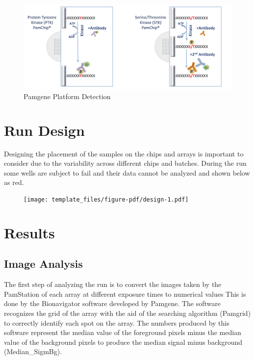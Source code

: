 \documentclass[
  letterpaper,
  DIV=11,
  numbers=noendperiod]{scrreport}
\begin{document}
\begin{figure}[htbp]

{\centering \includegraphics{images/pamgene_detectionFig.png}

}

\caption{Pamgene Platform Detection}

\end{figure}

\hypertarget{run-design}{%
\chapter{Run Design}\label{run-design}}

Designing the placement of the samples on the chips and arrays is
important to consider due to the variability across different chips and
batches. During the run some wells are subject to fail and their data
cannot be analyzed and shown below as red.

\begin{figure}[htbp]

{\centering \texttt{[image: template\_files/figure-pdf/design-1.pdf]}

}

\end{figure}

\hypertarget{results}{%
\chapter{Results}\label{results}}

\hypertarget{image-analysis}{%
\section{Image Analysis}\label{image-analysis}}

The first step of analyzing the run is to convert the images taken by
the PamStation of each array at different exposure times to numerical
values This is done by the Bionavigator software developed by Pamgene.
The software recognizes the grid of the array with the aid of the
searching algorithm (Pamgrid) to correctly identify each spot on the
array. The numbers produced by this software represent the median value
of the foreground pixels minus the median value of the background pixels
to produce the median signal minus background (Median\_SigmBg).
\end{document}
